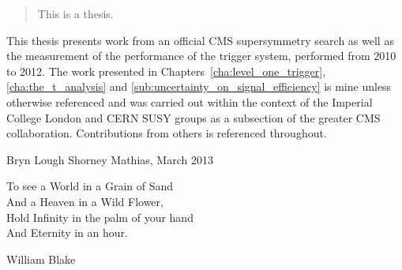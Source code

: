 \begin{abstract}
This is a thesis.

\end{abstract}


\begin{declaration}
This thesis presents work from an official CMS supersymmetry search as well as 
the measurement of the performance of the \Lone trigger system, performed from 
2010 to 2012. The work presented in Chapters~\ref{cha:level_one_trigger}, 
\ref{cha:the_t_analysis} and \ref{sub:uncertainty_on_signal_efficiency} is mine 
unless otherwise referenced and was carried out within the context of the 
Imperial College London and CERN SUSY groups as a subsection of the greater CMS 
collaboration. Contributions from others is referenced throughout.

\vspace*{1cm}

\begin{flushright}
Bryn Lough Shorney Mathias, March 2013
\end{flushright}

\end{declaration}


\begin{preface}
\begin{centering}To see a World in a Grain of Sand\\
And a Heaven in a Wild Flower,\\
Hold Infinity in the palm of your hand \\
And Eternity in an hour.\\
\end{centering}

\begin{flushright}
William Blake
\end{flushright}
\end{preface}

